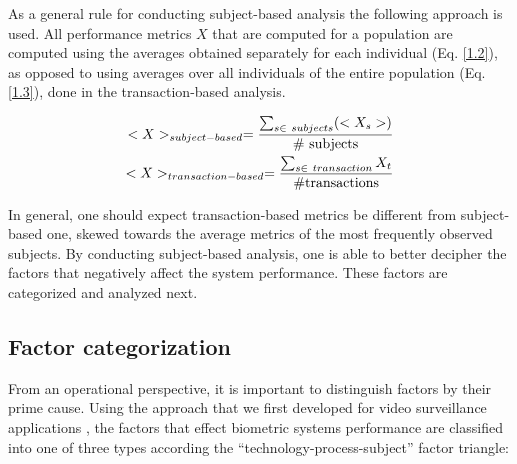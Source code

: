 \documentclass{cta-author}%
\begin{document}
As a general rule for conducting subject-based analysis the following approach is used.  All performance metrics $X$ that are computed for a population
are computed using the averages obtained separately for each individual (Eq. \ref{1.2}), as opposed to  
 using averages over all individuals of the entire population (Eq. \ref{1.3}), done in the transaction-based analysis.


\begin{eqnarray}
<X>_{subject-based} = { \sum_{s\in \ subjects} ( <X_s> ) \over {\rm \#\ subjects} }  \label{1.2} \\
<X>_{transaction-based} = { \sum_{s\in \ transaction}  X_t   \over {\rm \# transactions} } \label{1.3} 
\end{eqnarray}

In general, one should expect transaction-based metrics be different from subject-based one, skewed towards  the average metrics of the most frequently observed subjects.
By conducting subject-based analysis, one  is able to better decipher the factors that negatively affect the system performance.
These factors are categorized and analyzed next.



\subsection{Factor categorization}
\label{s.Factors}

From an operational perspective, it is important to distinguish factors by their prime cause.
Using the approach that we first developed for video surveillance applications 
\cite{GorodnichyVA}, 
the factors that effect biometric systems performance are classified into one of three types according the ``technology-process-subject'' factor triangle: 
\end{document}

